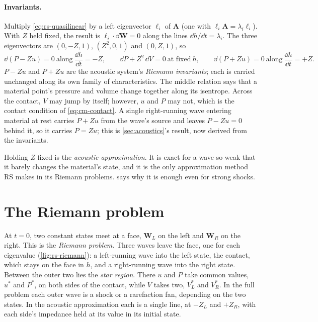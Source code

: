 \paragraph{Invariants.} Multiply \cref{eq:rs-quasilinear} by a left
eigenvector $\boldsymbol{\ell}_i$ of $\mathbf{A}$ (one with
$\boldsymbol{\ell}_i\mathbf{A} = \lambda_i\boldsymbol{\ell}_i$). With $Z$
held fixed, the result is $\boldsymbol{\ell}_i\cdot\dd\mathbf{W} = 0$ along
the lines $\dd h/\dd t = \lambda_i$. The three eigenvectors are $(0, -Z,
1)$, $(Z^2, 0, 1)$ and $(0, Z, 1)$, so
\begin{equation}
\dd(P - Zu) = 0 \ \text{along}\ \frac{\dd h}{\dd t} = -Z,
\qquad
\dd P + Z^2\,\dd V = 0 \ \text{at fixed}\ h,
\qquad
\dd(P + Zu) = 0 \ \text{along}\ \frac{\dd h}{\dd t} = +Z .
\label{eq:rs-invariants}
\end{equation}
$P - Zu$ and $P + Zu$ are the acoustic system's \emph{Riemann invariants};
each is carried unchanged along its own family of characteristics. The
middle relation says that a material point's pressure and volume change
together along its isentrope. Across the contact, $V$ may jump by itself;
however, $u$ and $P$ may not, which is the contact condition of
\cref{eq:cm-contact}. A single right-running wave entering material at
rest carries $P + Zu$ from the wave's source and leaves $P - Zu = 0$ behind
it, so it carries $P = Zu$; this is \cref{sec:acoustics}'s result, now
derived from the invariants.

Holding $Z$ fixed is the \emph{acoustic approximation}. It is exact for a
wave so weak that it barely changes the material's state, and it is the
only approximation method RS makes in its Riemann problems.
 says why it is enough even for strong shocks.

\section{The Riemann problem}
\label{sec:rs-riemann}

At $t = 0$, two constant states meet at a face, $\mathbf{W}_L$ on the left
and $\mathbf{W}_R$ on the right. This is the \emph{Riemann problem}. Three
waves leave the face, one for each eigenvalue (\cref{fig:rs-riemann}): a
left-running wave into the left state, the contact, which stays on the face
in $h$, and a right-running wave into the right state. Between the outer
two lies the \emph{star region}. There $u$ and $P$ take common values,
$u^*$ and $P^*$, on both sides of the contact, while $V$ takes two,
$V^*_L$ and $V^*_R$. In the full problem each outer wave is a shock or a
rarefaction fan, depending on the two states. In the acoustic
approximation each is a single line, at $-Z_L$ and $+Z_R$, with each
side's impedance held at its value in its initial state.

